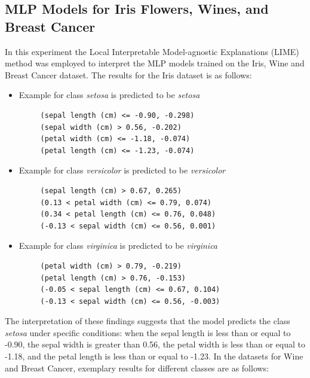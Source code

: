 \documentclass[journal, a4paper]{IEEEtran}
\begin{document}
\subsection{MLP Models for Iris Flowers, Wines, and Breast Cancer}\label{subsec:experiment-other-datasets}
In this experiment the Local Interpretable Model-agnostic Explanations (LIME) method was employed to interpret the MLP models trained on the Iris, Wine and Breast Cancer dataset.
The results for the Iris dataset is as follows:
\begin{itemize}
    \item Example for class \textit{setosa} is predicted to be \textit{setosa} \\
          {\tiny
          \begin{verbatim}
     (sepal length (cm) <= -0.90, -0.298)
     (sepal width (cm) > 0.56, -0.202)
     (petal width (cm) <= -1.18, -0.074)
     (petal length (cm) <= -1.23, -0.074)
    \end{verbatim}
          }

    \item Example for class \textit{versicolor} is predicted to be \textit{versicolor} \\
          {\tiny
          \begin{verbatim}
     (sepal length (cm) > 0.67, 0.265)
     (0.13 < petal width (cm) <= 0.79, 0.074)
     (0.34 < petal length (cm) <= 0.76, 0.048)
     (-0.13 < sepal width (cm) <= 0.56, 0.001)
    \end{verbatim}
          }

    \item Example for class \textit{virginica} is predicted to be \textit{virginica} \\
          {\tiny
          \begin{verbatim}
     (petal width (cm) > 0.79, -0.219)
     (petal length (cm) > 0.76, -0.153)
     (-0.05 < sepal length (cm) <= 0.67, 0.104)
     (-0.13 < sepal width (cm) <= 0.56, -0.003)
    \end{verbatim}
          }
\end{itemize}

The interpretation of these findings suggests that the model predicts the class \textit{setosa} under specific conditions: when the sepal length is less than or equal to -0.90, the sepal width is greater than 0.56, the petal width is less than or equal to -1.18, and the petal length is less than or equal to -1.23.
In the datasets for Wine and Breast Cancer, exemplary results for different classes are as follows:
\end{document}

